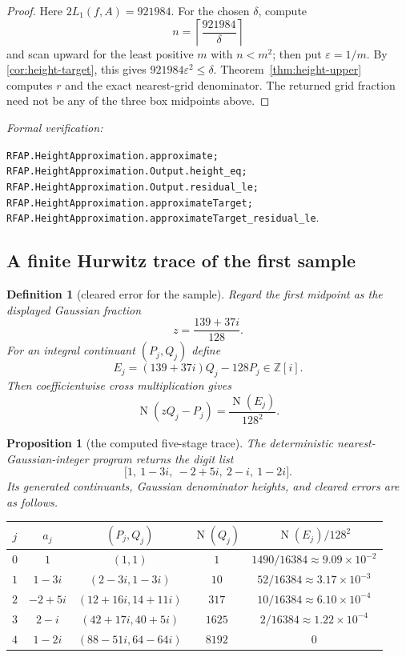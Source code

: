 \documentclass[11pt]{article}
\newtheorem{proposition}[proposition]{Proposition}
\newtheorem{definition}[definition]{Definition}
\newcommand{\Zi}{\mathbb{Z}[i]}
\newcommand{\Norm}[1]{\operatorname{N}\!\left(#1\right)}
\newcommand{\eps}{\varepsilon}
\newcommand{\leanref}[1]{\par\smallskip\noindent
  \emph{Formal verification:}\par\nobreak
  {\raggedright\nolinkurl{#1}.\par}}
\begin{document}
\begin{proof}
Here $2L_1(f,A)=921984$.  For the chosen $\delta$, compute
\[
 n=\left\lceil\frac{921984}{\delta}\right\rceil
\]
and scan upward for the least positive $m$ with $n<m^2$; then put
$\eps=1/m$.  By \cref{cor:height-target}, this gives
$921984\eps^2\le\delta$.  Theorem~\ref{thm:height-upper} computes $r$ and
the exact nearest-grid denominator.  The returned grid fraction need not be
any of the three box midpoints above.
\end{proof}

\leanref{RFAP.HeightApproximation.approximate;
RFAP.HeightApproximation.Output.height_eq;
RFAP.HeightApproximation.Output.residual_le;
RFAP.HeightApproximation.approximateTarget;
RFAP.HeightApproximation.approximateTarget_residual_le}

\subsection{A finite Hurwitz trace of the first sample}

\begin{definition}[cleared error for the sample]
\label{def:cubic-cleared-error}
Regard the first midpoint as the displayed Gaussian fraction
\[
                          z=\frac{139+37i}{128}.
\]
For an integral continuant $(P_j,Q_j)$ define
\[
          E_j=(139+37i)Q_j-128P_j\in\Zi.
\]
Then coefficientwise cross multiplication gives
\begin{equation}
\label{eq:cubic-cleared-error}
                  \Norm{zQ_j-P_j}=\frac{\Norm{E_j}}{128^2}.
\end{equation}
\end{definition}

\begin{proposition}[the computed five-stage trace]
\label{prop:cubic-hurwitz-trace}
The deterministic nearest-Gaussian-integer program returns the digit list
\[
              \bigl[1,\ 1-3i,\ -2+5i,\ 2-i,\ 1-2i\bigr].
\]
Its generated continuants, Gaussian denominator heights, and cleared errors
are as follows.

\begin{center}
\scriptsize
\begin{tabular}{@{}ccccc@{}}
\toprule
$j$ & $a_j$ & $(P_j,Q_j)$ & $\Norm{Q_j}$
    & $\Norm{E_j}/128^2$\\
\midrule
$0$ & $1$ & $(1,1)$ & $1$
    & $1490/16384\approx9.09\mathbin{\times}10^{-2}$\\
$1$ & $1-3i$ & $(2-3i,1-3i)$ & $10$
    & $52/16384\approx3.17\mathbin{\times}10^{-3}$\\
$2$ & $-2+5i$ & $(12+16i,14+11i)$ & $317$
    & $10/16384\approx6.10\mathbin{\times}10^{-4}$\\
$3$ & $2-i$ & $(42+17i,40+5i)$ & $1625$
    & $2/16384\approx1.22\mathbin{\times}10^{-4}$\\
$4$ & $1-2i$ & $(88-51i,64-64i)$ & $8192$
    & $0$\\
\bottomrule
\end{tabular}
\end{center}
\end{proposition}
\end{document}
